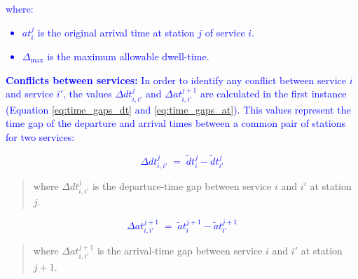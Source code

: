 \documentclass[Afour,sagev,times]{sagej}
\newcommand{\primero}[1]{\textcolor{blue}{#1}}
\begin{document}

\primero{
where:
\begin{itemize}
  \item $at_{i}^{j}$ is the original arrival time at station $j$ of service $i$.
  \item $\Delta_{\max}$ is the maximum allowable dwell-time.
\end{itemize}
}

\primero{\textbf{Conflicts between services: } In order to identify any conflict between service $ i $ and service $ i' $, the values $ \Delta dt_{i,i'}^{j} $ and $ \Delta at_{i,i'}^{j+1} $ are calculated in the first instance (Equation \ref{eq:time_gaps_dt} and \ref{eq:time_gaps_at}). This values represent the time gap of the departure and arrival times between a common pair of stations for two services: }


\primero{
\begin{equation}
\Delta dt_{i,i'}^{j} \;=\; \tilde dt_{i}^{j} - \tilde dt_{i'}^{j}
\label{eq:time_gaps_dt}
\end{equation}
}

\primero{
\begin{quote}
where $\Delta dt_{i,i'}^{j}$ is the departure‐time gap between service $i$ and $i'$ at station $j$.
\end{quote}
}

\primero{
\begin{equation}
\Delta at_{i,i'}^{j+1} \;=\; \tilde at_{i}^{j+1} - \tilde at_{i'}^{j+1}
\label{eq:time_gaps_at}
\end{equation}
}

\primero{
\begin{quote}
where $\Delta at_{i,i'}^{j+1}$ is the arrival‐time gap between service $i$ and $i'$ at station $j+1$.
\end{quote}
}
\end{document}
